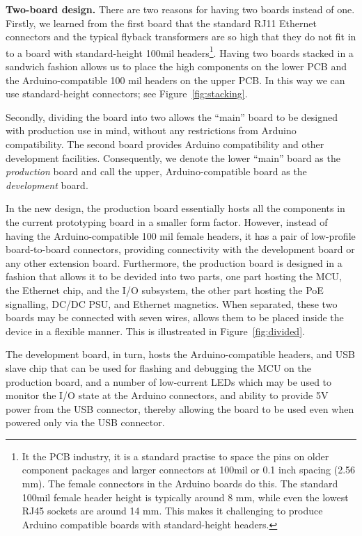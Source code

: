 \documentclass[draft,a4paper]{siamltex}
\begin{document}
{\bf Two-board design.}
There are two reasons for having two boards instead of one.  Firstly,
we learned from the first board that the standard RJ11 Ethernet
connectors and the typical flyback transformers are so high that they
do not fit in to a board with standard-height 100mil
headers\footnote{It the PCB industry, it is a standard practise to
  space the pins on older component packages and larger connectors at
  100mil or 0.1 inch spacing (2.56 mm).  The female connectors in the Arduino
  boards do this.  The standard 100mil female header height is
  typically around 8 mm, while even the lowest RJ45 sockets
  are around 14 mm.  This makes it challenging to produce Arduino
  compatible boards with standard-height headers.}.
Having two boards stacked in a sandwich fashion allows us to place the
high components on the lower PCB and the Arduino-compatible 100 mil
headers on the upper PCB.  In this way we can use standard-height
connectors; see Figure~\ref{fig:stacking}.

Secondly, dividing the board into two allows the ``main'' board to be
designed with production use in mind, without any restrictions from
Arduino compatibility.  The second board provides Arduino
compatibility and other development facilities.  Consequently, we denote
the lower ``main'' board as the {\it production} board and call the
upper, Arduino-compatible board as the {\it development} board.

In the new design, the production board essentially hosts all the
components in the current prototyping board in a smaller form factor.
However, instead of having the Arduino-compatible 100 mil female
headers, it has a pair of low-profile board-to-board connectors,
providing connectivity with the development board or any other
extension board.  Furthermore, the production board is designed in a
fashion that allows it to be devided into two parts, one part hosting
the MCU, the Ethernet chip, and the I/O subsystem, the other part hosting the
PoE signalling, DC/DC PSU, and Ethernet magnetics.  When separated,
these two boards may be connected with seven wires, allows them to be
placed inside the device in a flexible manner.  This is illustreated
in Figure~\ref{fig:divided}.

The development board, in turn, hosts the Arduino-compatible headers,
and USB slave chip that can be used for flashing and debugging the MCU
on the production board, and a number of low-current LEDs which may be
used to monitor the I/O state at the Arduino connectors, and ability
to provide 5V power from the USB connector, thereby allowing the board
to be used even when powered only via the USB connector.
\end{document}
